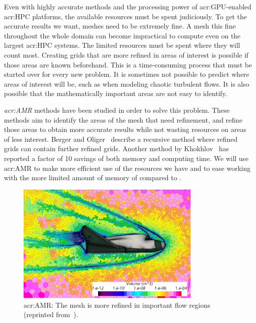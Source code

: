 Even with highly accurate methods and the processing power of \acrshort{acr:GPU}-enabled
\acrshort{acr:HPC} platforms, the available resources must be spent judiciously. To get the accurate
results we want, meshes need to be extremely fine. A mesh this fine throughout the whole domain can
become impractical to compute even on the largest \acrshort{acr:HPC} systems. The limited resources
must be spent where they will count most. Creating grids that are more refined in areas of interest
is possible if those areas are known beforehand. This is a time-consuming process that must be
started over for every new problem. It is sometimes not possible to predict where areas of interest
will be, such as when modeling chaotic turbulent flows. It is also possible that the mathematically
important areas are not easy to identify. 

\textit{\Acrfull{acr:AMR}} methods have been studied in order to solve this problem. These methods
aim to identify the areas of the mesh that need refinement, and refine those areas to obtain more
accurate results while not wasting resources on areas of less interest. Berger and
Oliger~\cite{Berger1984} describe a recursive method where refined grids can contain further refined
grids. Another method by Khokhlov~\cite{Khokhlov1998} has reported a factor of 10 savings of both
memory and computing time. We will use \acrlong{acr:AMR} to make more efficient use of the resources
we have and to ease working with the more limited amount of memory of  compared
to .

\begin{figure}[H]
	\centering
	\includegraphics[width=0.8\textwidth]{Chapter_introduction/media/adaptive_mesh_refinement}
	\caption{\Acrlong{acr:AMR}: The mesh is more refined in important flow regions (reprinted from~\cite{Siemens2020}).}\label{fig:intro_amr}
\end{figure}

